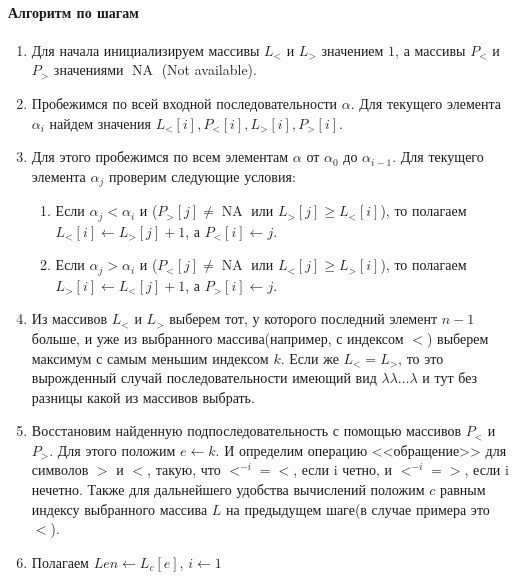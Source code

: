 \documentclass[12pt]{article}
\newcommand{\NA}{\operatorname{NA}}
\begin{document}
\paragraph{Алгоритм по шагам}
\begin{enumerate}
    \item Для начала инициализируем массивы $ L_< $ и $ L_> $ значением $ 1 $, а массивы $ P_< $ и $ P_> $
    значениями $ \NA $ (Not available).

    \item Пробежимся по всей входной последовательности $ \alpha $. Для текущего элемента $ \alpha_i $
    найдем значения $ L_<[i],P_<[i],L_>[i],P_>[i] $. 

    \item Для этого пробежимся по всем элементам $ \alpha $ от $ \alpha_0 $ до $ \alpha_{i - 1} $. Для
    текущего элемента $ \alpha_j $ проверим следующие условия:
    \begin{enumerate}
        \item Если $ \alpha_j < \alpha_i $ и ($ P_>[j] \ne \NA $ или $ L_>[j] \ge L_<[i] $), то
        полагаем $ L_<[i] \leftarrow L_>[j] + 1 $, а $ P_<[i] \leftarrow j $.
        
        \item Если $ \alpha_j > \alpha_i $ и ($ P_<[j] \ne \NA $ или $ L_<[j] \ge L_>[i] $), то
        полагаем $ L_>[i] \leftarrow L_<[j] + 1 $, а $ P_>[i] \leftarrow j $.
    \end{enumerate}

    \item Из массивов $ L_< $ и $ L_> $ выберем тот, у которого последний элемент $ n - 1 $ больше,
    и уже из выбранного массива(например, с индексом $ < $) выберем максимум с самым меньшим индексом $ k $.
    Если же $ L_< = L_> $, то это вырожденный случай последовательности имеющий вид 
    $ \lambda \lambda \dots \lambda $ и тут без разницы какой из массивов выбрать.

    \item Восстановим найденную подпоследовательность с помощью массивов $ P_< $ и $ P_> $. Для этого положим
    $ e \leftarrow k$. И определим операцию <<обращение>> для символов $>$ и $<$, такую, что $<^{-i} = <$, если
    i четно, и $<^{-i} = >$, если i нечетно. Также для дальнейшего удобства вычислений положим $ c $ равным
    индексу выбранного массива $ L $ на предыдущем шаге(в случае примера это $ < $).

    \item Полагаем $ Len \leftarrow L_c[e]$, $ i \leftarrow 1 $


\end{enumerate}
\end{document}
